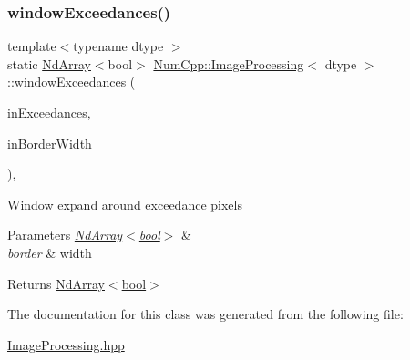 \subsubsection{\texorpdfstring{window\+Exceedances()}{windowExceedances()}}
{\footnotesize\ttfamily template$<$typename dtype $>$ \\
static \mbox{\hyperlink{class_num_cpp_1_1_nd_array}{Nd\+Array}}$<$bool$>$ \mbox{\hyperlink{class_num_cpp_1_1_image_processing}{Num\+Cpp\+::\+Image\+Processing}}$<$ dtype $>$\+::window\+Exceedances (\begin{DoxyParamCaption}\item[{const \mbox{\hyperlink{class_num_cpp_1_1_nd_array}{Nd\+Array}}$<$ bool $>$ \&}]{in\+Exceedances,  }\item[{\mbox{\hyperlink{namespace_num_cpp_aee396d0469d6031cd18118c0a45bcdda}{uint8}}}]{in\+Border\+Width }\end{DoxyParamCaption})\hspace{0.3cm}{\ttfamily [inline]}, {\ttfamily [static]}}

Window expand around exceedance pixels


\begin{DoxyParams}{Parameters}
{\em \mbox{\hyperlink{class_num_cpp_1_1_nd_array}{Nd\+Array$<$bool$>$}}} & \\
\hline
{\em border} & width \\
\hline
\end{DoxyParams}
\begin{DoxyReturn}{Returns}
\mbox{\hyperlink{class_num_cpp_1_1_nd_array}{Nd\+Array$<$bool$>$}} 
\end{DoxyReturn}


The documentation for this class was generated from the following file\+:\begin{DoxyCompactItemize}
\item 
\mbox{\hyperlink{_image_processing_8hpp}{Image\+Processing.\+hpp}}\end{DoxyCompactItemize}
